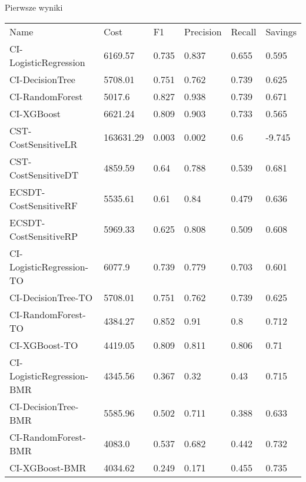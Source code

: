 \documentclass[10pt]{beamer}
\begin{document}
\begin{frame}{Pierwsze wyniki}
\begin{center}
    \begin{table}[]
    \footnotesize
        \begin{tabular}{llllll}
        Name                      & Cost      & F1    & Precision & Recall & Savings \\
        CI-LogisticRegression     & 6169.57   & 0.735 & 0.837     & 0.655  & 0.595   \\
        CI-DecisionTree           & 5708.01   & 0.751 & 0.762     & 0.739  & 0.625   \\
        CI-RandomForest           & 5017.6    & 0.827 & 0.938     & 0.739  & 0.671   \\
        CI-XGBoost                & 6621.24   & 0.809 & 0.903     & 0.733  & 0.565   \\
        CST-CostSensitiveLR       & 163631.29 & 0.003 & 0.002     & 0.6    & -9.745  \\
        CST-CostSensitiveDT       & 4859.59   & 0.64  & 0.788     & 0.539  & 0.681   \\
        ECSDT-CostSensitiveRF     & 5535.61   & 0.61  & 0.84      & 0.479  & 0.636   \\
        ECSDT-CostSensitiveRP     & 5969.33   & 0.625 & 0.808     & 0.509  & 0.608   \\
        CI-LogisticRegression-TO  & 6077.9    & 0.739 & 0.779     & 0.703  & 0.601   \\
        CI-DecisionTree-TO        & 5708.01   & 0.751 & 0.762     & 0.739  & 0.625   \\
        CI-RandomForest-TO        & 4384.27   & 0.852 & 0.91      & 0.8    & 0.712   \\
        CI-XGBoost-TO             & 4419.05   & 0.809 & 0.811     & 0.806  & 0.71    \\
        CI-LogisticRegression-BMR & 4345.56   & 0.367 & 0.32      & 0.43   & 0.715   \\
        CI-DecisionTree-BMR       & 5585.96   & 0.502 & 0.711     & 0.388  & 0.633   \\
        CI-RandomForest-BMR       & 4083.0    & 0.537 & 0.682     & 0.442  & 0.732   \\
        CI-XGBoost-BMR            & 4034.62   & 0.249 & 0.171     & 0.455  & 0.735  
        \end{tabular}
    \end{table}
\end{center}{}
\end{frame}
\end{document}
